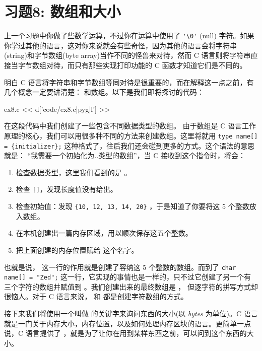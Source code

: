\chapter{习题8: 数组和大小}

上一个习题中你做了些数学运算，不过你在运算中使用了 \verb|'\0'| (null) 字符。如果你学过其他的语言，这对你来说就会有些奇怪，因为其他的语言会将字符串(string)和字节数组(byte array)当作不同的怪兽来对待，然而 C 语言则将字符串直接当字节数组对待，而只有那些实现打印功能的 C 函数才知道它们是不同的。

明白 C 语言将字符串和字节数组等同对待是很重要的，而在解释这一点之前，有几个概念一定要讲清楚：  和数组。以下是我们即将探讨的代码：

\begin{code}{ex8.c}
<< d['code/ex8.c|pyg|l'] >>
\end{code}

在这段代码中我们创建了一些包含不同数据类型的数组。 由于数组是 C 语言工作原理的核心，我们可以用很多种不同的方法来创建数组。这里将就用 \verb|type name[] = {initializer};| 这种格式了，往后我们还会碰到更多的方式。这个语法的意思就是： “我需要一个初始化为{..}类型的数组”，当 C 接收到这个指令时，将会： 

\begin{enumerate}
\item 检查数据类型，这里我们看到的是 。
\item 检查 \verb|[]|，发现长度值没有给出。
\item 检查初始值：发现 \verb|{10, 12, 13, 14, 20}| ，于是知道了你要将这 5 个整数放入数组。
\item 在本机创建出一篇内存区域，用以顺次保存这五个整数。
\item 把上面创建的内存位置赋给  这个名字。
\end{enumerate}


也就是说，  这一行的作用就是创建了容纳这 5 个整数的数组。而到了 \verb|char name[] = "Zed";| 这一行，它实现的事情也是一样的，只不过它创建了另一个有三个字符的数组并赋值到 。我们创建出来的最终数组是 ， 但逐字符的拼写方式却很恼人。对于 C 语言来说，  和  都是创建字符数组的方式。

接下来我们将使用一个叫做  的关键字来询问东西的大小(以 \emph{bytes} 为单位)。C 语言就是一门关于内存大小，内存位置，以及如何处理内存区块的语言。更简单一点说，C 语言提供了 ，就是为了让你在用到某样东西之前，可以问到这个东西的大小。

